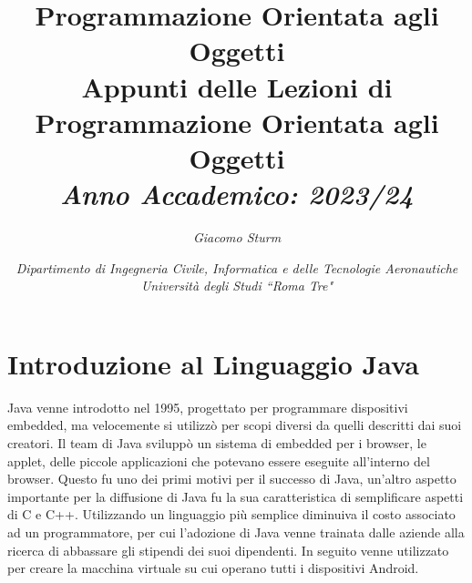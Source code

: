 \documentclass{article}
\numberwithin{equation}{subsection}
\begin{document}
\title{%
    \textbf{Programmazione Orientata agli Oggetti}  \\ 
    \large Appunti delle Lezioni di Programmazione Orientata agli Oggetti \\
    \textit{Anno Accademico: 2023/24}}
\author{\textit{Giacomo Sturm}}
\date{\textit{Dipartimento di Ingegneria Civile, Informatica e delle Tecnologie Aeronautiche \\
Università degli Studi ``Roma Tre"}}

\maketitle
\thispagestyle{link}

\clearpage


\pagestyle{fancy}
\fancyhead{}\fancyfoot{}
\fancyfoot[C]{\thepage}

\tableofcontents

\clearpage







\section{Introduzione al Linguaggio Java}



Java venne introdotto nel 1995, progettato per programmare dispositivi embedded, ma velocemente si utilizzò per scopi diversi da quelli descritti dai suoi 
creatori. Il team di Java sviluppò un sistema di embedded per i browser, le applet, delle piccole applicazioni che potevano essere eseguite all'interno 
del browser. Questo fu uno dei primi motivi per il successo di Java, un'altro aspetto importante per la diffusione di Java fu la sua caratteristica di 
semplificare aspetti di C e C++. Utilizzando un linguaggio più semplice diminuiva il costo associato ad un programmatore, per cui l'adozione di Java 
venne trainata dalle aziende alla ricerca di abbassare gli stipendi dei suoi dipendenti. In seguito venne utilizzato per creare la macchina virtuale su 
cui operano tutti i dispositivi Android. 
\end{document}
